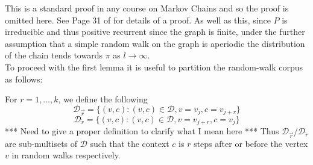 \documentclass[a4paper]{article}
\newcommand{\D}{\mathcal D}
\newcommand{\rar}{\overrightarrow r}
\newcommand{\lar}{\overleftarrow r}
\begin{document}
This is a standard proof in any course on Markov Chains and so the proof is
omitted here. See Page 31 of \cite{markov_chains} for details of a proof. As
well as this, since $P$ is irreducible and thus positive recurrent since the
graph is finite, under the further assumption that a simple random walk on the
graph is aperiodic the distribution of the chain tends towards $\pi$ as
$l \to \infty$.\\
To proceed with the first lemma it is useful to partition the random-walk corpus as follows:

\begin{definition}
  For $r = 1, \dots, k$, we define the following
  \[\D_{\rar} = \{ (v, c) : (v, c) \in \D, v = v_j, c = v_{j+r}\}\]
  \[\D_{\lar} = \{ (v, c) : (v, c) \in \D, v = v_{j+r}, c = v_{j}\}\]
  *** Need to give a proper definition to clarify what I mean here ***
  Thus $\D_{\rar}$/$\D_{\lar}$ are sub-multisets of $\D$ such that the context
  $c$ is $r$ steps after or before the vertex $v$ in random walks respectively.
\end{definition}
\end{document}
